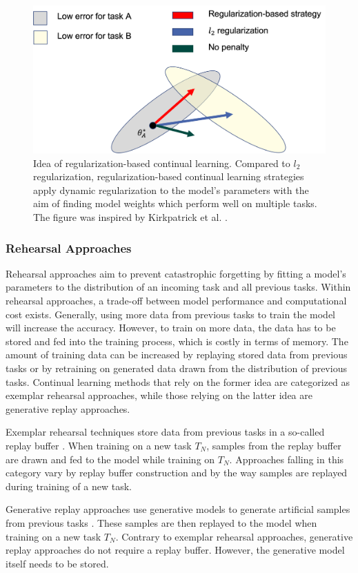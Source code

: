 \begin{figure} [ht]
    \centering
    \includegraphics[width=.9\linewidth]{images/regularization_idea.png}
    \caption[Idea of regularization-based continual learning]{Idea of regularization-based continual learning. Compared to $l_2$ regularization,
    regularization-based continual learning strategies apply dynamic regularization to the model's parameters with the aim of finding model
    weights which perform well on multiple tasks. The figure was inspired by Kirkpatrick et al. \cite{kirkpatrick2017overcoming}.}
    \label{fig:ContinualLearning:RegularizationIdea}
\end{figure}

\subsubsection{Rehearsal Approaches}
\label{sec:RehearsalApproaches}
Rehearsal approaches aim to prevent catastrophic forgetting by fitting a model's parameters to the distribution
of an incoming task and all previous tasks. Within rehearsal approaches, a trade-off between
model performance and computational cost exists. Generally, using more data from previous tasks to train the model will increase the accuracy. 
However, to train on more data, the data has to be stored and fed into the training process, which is costly in terms of memory.
The amount of training data can be increased by replaying stored data from previous tasks or by
retraining on generated data drawn from the distribution of previous tasks. Continual learning methods that rely on the former idea are
categorized as exemplar rehearsal approaches, while those relying on the latter idea are generative replay
approaches. \par
Exemplar rehearsal techniques store data from previous tasks in a so-called replay buffer \cite{chaudhry2018efficient}. When training on a new task $T_N$, samples
from the replay buffer are drawn and fed to the model while training on $T_N$. Approaches falling in this category vary by replay buffer
construction and by the way samples are replayed during training of a new task. \par
Generative replay approaches use generative models to generate artificial samples from previous tasks \cite{shin2017continual}. These samples are then replayed to
the model when training on a new task $T_N$. Contrary to exemplar rehearsal approaches, generative replay approaches do not require a replay buffer.
However, the generative model itself needs to be stored. 

